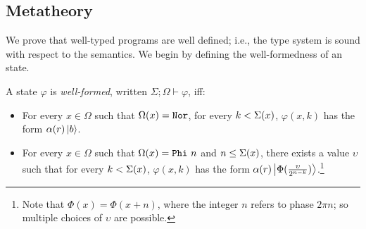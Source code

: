 
\subsection{\oqasm Metatheory}\label{sec:metatheory}

We prove that well-typed \oqasm programs are well defined; i.e., the
type system is sound with respect to the semantics. 
We begin by defining the well-formedness of an \oqasm state.

\begin{definition}\label{appx:well-formed}\rm 
  A state $\varphi$ is \emph{well-formed}, written
  $\Sigma;\Omega \vdash \varphi$, iff:
\begin{itemize}
\item For every $x \in \Omega$ such that $\Omega(x) = \texttt{Nor}$,
  for every $k <\Sigma(x)$, $\varphi(x,k)$ has the form
  $\alpha(r)\left\vert{b}\right\rangle$.

\item For every $x \in \Omega$ such that $\Omega(x) = \texttt{Phi}~{n}$ and $n \le \Sigma(x)$,
  there exists a value $\upsilon$ such that for
  every $k < \Sigma(x)$, $\varphi(x,k)$ has the form
  $\alpha(r)\left\vert{\Phi(\frac{\upsilon}{ 2^{n- k}})}\right\rangle$.\footnote{Note that $\Phi(x) = \Phi(x + n)$, where the integer $n$ refers to phase $2 \pi n$; so multiple choices of $\upsilon$ are possible.}
\end{itemize}
\end{definition}

